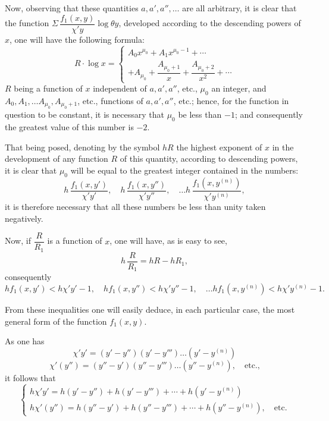 \documentclass{article}
\begin{document}
Now, observing that these quantities $a, a', a'', \ldots$ are all arbitrary, it is clear that the function $\Sigma\,\dfrac{f_1(x, y)}{\chi' y}\log\theta y$, developed according to the descending powers of $x$, one will have the following formula:
\[ R \cdot \log x = \begin{cases} A_0 x^{\mu_0} + A_1 x^{\mu_0-1} + \cdots \\ + A_{\mu_0} + \dfrac{A_{\mu_0+1}}{x} + \dfrac{A_{\mu_0+2}}{x^{2}} + \cdots \end{cases} \]
$R$ being a function of $x$ independent of $a, a', a''$, etc., $\mu_0$ an integer, and $A_0, A_1, \ldots A_{\mu_0}, A_{\mu_0+1}$, etc., functions of $a, a', a''$, etc.; hence, for the function in question to be constant, it is necessary that $\mu_0$ be less than $-1$; and consequently the greatest value of this number is $-2$.

That being posed, denoting by the symbol $hR$ the highest exponent of $x$ in the development of any function $R$ of this quantity, according to descending powers, it is clear that $\mu_0$ will be equal to the greatest integer contained in the numbers:
\[ h\,\frac{f_1(x, y')}{\chi' y'}, \quad h\,\frac{f_1(x, y'')}{\chi' y''}, \quad \ldots h\,\frac{f_1(x, y^{(n)})}{\chi' y^{(n)}}, \]
it is therefore necessary that all these numbers be less than unity taken negatively.

Now, if $\dfrac{R}{R_1}$ is a function of $x$, one will have, as is easy to see,
\[ h\,\frac{R}{R_1} = hR - hR_1, \]
consequently
\[ hf_1(x, y') < h\chi' y' - 1, \quad hf_1(x, y'') < h\chi' y'' - 1, \quad \ldots hf_1(x, y^{(n)}) < h\chi' y^{(n)} - 1. \tag{47} \]

From these inequalities one will easily deduce, in each particular case, the most general form of the function $f_1(x, y)$.

As one has
\[ \chi' y' = (y'-y'')(y'-y''') \ldots (y'-y^{(n)}) \]
\[ \chi'(y'') = (y''-y')(y''-y''') \ldots (y''-y^{(n)}), \quad \text{etc.,} \]
it follows that
\[ \begin{cases} h\chi' y' = h(y'-y'') + h(y'-y''') + \cdots + h(y'-y^{(n)}) \\ h\chi'(y'') = h(y''-y') + h(y''-y''') + \cdots + h(y''-y^{(n)}), \quad \text{etc.} \end{cases} \tag{48} \]
\end{document}
